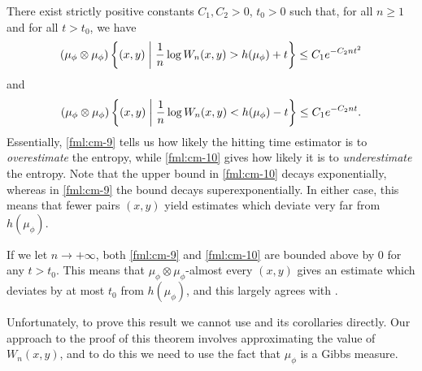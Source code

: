 \begin{theorem} \label{thm:cm-4-3}
	There exist strictly positive constants $C_1, C_2 > 0$, $t_0 > 0$ such that, for all $n \geq 1$ and for all $t > t_0$, we have
	\begin{equation}
		(\mu_\phi \otimes \mu_\phi)\left\{(x, y) \mathrel{}\middle|\mathrel{} \frac{1}{n}\log{W_n(x, y)} > h(\mu_\phi) + t\right\} \leq C_1 e^{-C_2 nt^2} \label{fml:cm-9}
	\end{equation}
	and
	\begin{equation}
		(\mu_\phi \otimes \mu_\phi)\left\{(x, y) \mathrel{}\middle|\mathrel{} \frac{1}{n}\log{W_n(x, y)} < h(\mu_\phi) - t\right\} \leq C_1 e^{-C_2 nt}. \label{fml:cm-10}
	\end{equation}	
	Essentially, \eqref{fml:cm-9} tells us how likely the hitting time estimator is to \emph{overestimate} the entropy, while \eqref{fml:cm-10} gives how likely it is to \emph{underestimate} the entropy. Note that the upper bound in \eqref{fml:cm-10} decays exponentially, whereas in \eqref{fml:cm-9} the bound decays superexponentially. In either case, this means that fewer pairs $(x, y)$ yield estimates which deviate very far from $h(\mu_\phi)$.
	
	If we let $n \to +\infty$, both \eqref{fml:cm-9} and \eqref{fml:cm-10} are bounded above by $0$ for any $t > t_0$. This means that $\mu_\phi \otimes \mu_\phi$-almost every $(x, y)$ gives an estimate which deviates by at most $t_0$ from $h(\mu_\phi)$, and this largely agrees with .
	
	Unfortunately, to prove this result we cannot use  and its corollaries directly. Our approach to the proof of this theorem involves approximating the value of $W_n(x, y)$, and to do this we need to use the fact that $\mu_\phi$ is a Gibbs measure.
	

\end{theorem}
